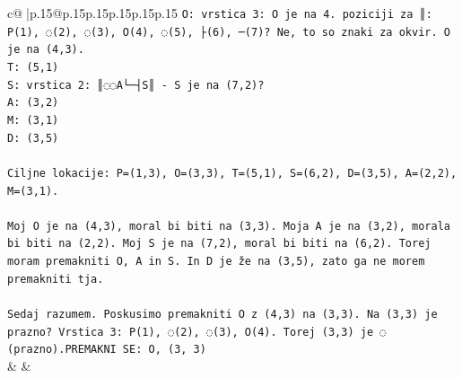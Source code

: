 \documentclass{article}
\begin{document}
{\begin{supertabular}{c@{$\;$}|p{.15\linewidth}@{}p{.15\linewidth}p{.15\linewidth}p{.15\linewidth}p{.15\linewidth}p{.15\linewidth}}
{{{\texttt{O: vrstica 3: O je na 4. poziciji za ║: P(1), ◌(2), ◌(3), O(4), ◌(5), ├(6), ─(7)? Ne, to so znaki za okvir. O je na (4,3).} \\
\texttt{T: (5,1)} \\
\texttt{S: vrstica 2: ║◌◌A└─┤S║ {-} S je na (7,2)? } \\
\texttt{A: (3,2)} \\
\texttt{M: (3,1)} \\
\texttt{D: (3,5)} \\
\\ 
\texttt{Ciljne lokacije: P=(1,3), O=(3,3), T=(5,1), S=(6,2), D=(3,5), A=(2,2), M=(3,1).} \\
\\ 
\texttt{Moj O je na (4,3), moral bi biti na (3,3). Moja A je na (3,2), morala bi biti na (2,2). Moj S je na (7,2), moral bi biti na (6,2). Torej moram premakniti O, A in S. In D je že na (3,5), zato ga ne morem premakniti tja.} \\
\\ 
\texttt{Sedaj razumem. Poskusimo premakniti O z (4,3) na (3,3). Na (3,3) je prazno? Vrstica 3: P(1), ◌(2), ◌(3), O(4). Torej (3,3) je ◌ (prazno).PREMAKNI SE: O, (3, 3)} \\
            }
        }
    }
    & & \\ \\


\end{supertabular}}
\end{document}
